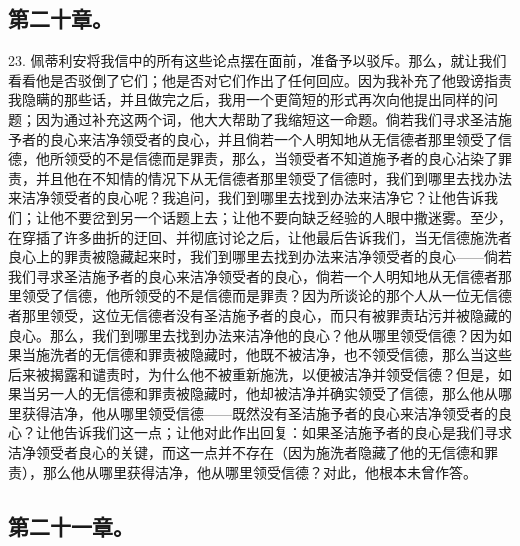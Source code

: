 \subsection{第二十章。}

23. 佩蒂利安将我信中的所有这些论点摆在面前，准备予以驳斥。那么，就让我们看看他是否驳倒了它们；他是否对它们作出了任何回应。因为我补充了他毁谤指责我隐瞒的那些话，并且做完之后，我用一个更简短的形式再次向他提出同样的问题；因为通过补充这两个词，他大大帮助了我缩短这一命题。倘若我们寻求圣洁施予者的良心来洁净领受者的良心，并且倘若一个人明知地从无信德者那里领受了信德，他所领受的不是信德而是罪责，那么，当领受者不知道施予者的良心沾染了罪责，并且他在不知情的情况下从无信德者那里领受了信德时，我们到哪里去找办法来洁净领受者的良心呢？我追问，我们到哪里去找到办法来洁净它？让他告诉我们；让他不要岔到另一个话题上去；让他不要向缺乏经验的人眼中撒迷雾。至少，在穿插了许多曲折的迂回、并彻底讨论之后，让他最后告诉我们，当无信德施洗者良心上的罪责被隐藏起来时，我们到哪里去找到办法来洁净领受者的良心——倘若我们寻求圣洁施予者的良心来洁净领受者的良心，倘若一个人明知地从无信德者那里领受了信德，他所领受的不是信德而是罪责？因为所谈论的那个人从一位无信德者那里领受，这位无信德者没有圣洁施予者的良心，而只有被罪责玷污并被隐藏的良心。那么，我们到哪里去找到办法来洁净他的良心？他从哪里领受信德？因为如果当施洗者的无信德和罪责被隐藏时，他既不被洁净，也不领受信德，那么当这些后来被揭露和谴责时，为什么他不被重新施洗，以便被洁净并领受信德？但是，如果当另一人的无信德和罪责被隐藏时，他却被洁净并确实领受了信德，那么他从哪里获得洁净，他从哪里领受信德——既然没有圣洁施予者的良心来洁净领受者的良心？让他告诉我们这一点；让他对此作出回复：如果圣洁施予者的良心是我们寻求洁净领受者良心的关键，而这一点并不存在（因为施洗者隐藏了他的无信德和罪责），那么他从哪里获得洁净，他从哪里领受信德？对此，他根本未曾作答。\par


\subsection{第二十一章。}

